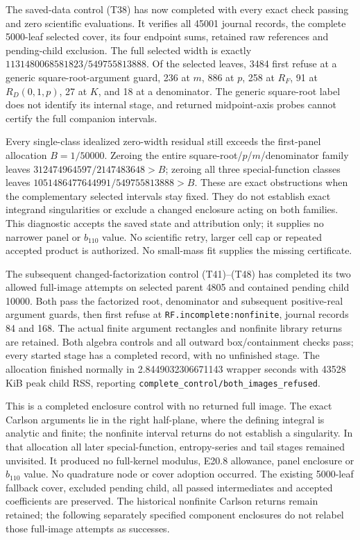 \documentclass[10pt]{article}
\begin{document}
The saved-data control (T38) has now completed with every exact
check passing and zero scientific evaluations. It verifies all
45001 journal records, the complete 5000-leaf selected cover,
its four endpoint sums, retained raw references and pending-child
exclusion. The full selected width is exactly
$1131480068581823/549755813888$.
Of the selected leaves, 3484 first refuse at a generic
square-root-argument guard, 236 at $m$, 886 at $p$, 258 at
$R_F$, 91 at $R_D(0,1,p)$, 27 at $K$, and 18 at a denominator.
The generic square-root label does not identify its internal
stage, and returned midpoint-axis probes cannot certify the
full companion intervals.

Every single-class idealized zero-width residual still exceeds
the first-panel allocation $B=1/50000$. Zeroing the entire
square-root/$p$/$m$/denominator family leaves
$312474964597/2147483648>B$; zeroing all three special-function
classes leaves $1051486477644991/549755813888>B$.
These are exact obstructions when the complementary selected
intervals stay fixed. They do not establish exact integrand
singularities or exclude a changed enclosure acting on both
families. This diagnostic accepts the saved state and attribution
only; it supplies no narrower panel or $b_{110}$ value.
No scientific retry, larger cell cap or repeated accepted product
is authorized. No small-mass fit supplies the missing certificate.

The subsequent changed-factorization control (T41)--(T48)
has completed its two allowed full-image attempts on selected
parent 4805 and contained pending child 10000. Both pass the
factorized root, denominator and subsequent positive-real
argument guards, then first refuse at
\texttt{RF.incomplete:nonfinite}, journal records 84 and 168.
The actual finite argument rectangles and nonfinite library
returns are retained. Both algebra controls and all outward
box/containment checks pass; every started stage has a
completed record, with no unfinished stage.
The allocation finished normally in 2.8449032306671143 wrapper
seconds with 43528 KiB peak child RSS, reporting
\texttt{complete\_control/both\_images\_refused}.

This is a completed enclosure control with no returned
full image. The exact Carlson arguments lie in the right
half-plane, where the defining integral is analytic and
finite; the nonfinite interval returns do not establish a
singularity. In that allocation all later special-function,
entropy-series and tail stages remained unvisited. It produced
no full-kernel modulus, E20.8 allowance, panel enclosure or $b_{110}$ value.
No quadrature node or cover adoption occurred. The existing
5000-leaf fallback cover, excluded pending child, all passed
intermediates and accepted coefficients are preserved.
The historical nonfinite Carlson returns remain retained;
the following separately specified component enclosures
do not relabel those full-image attempts as successes.
\end{document}
